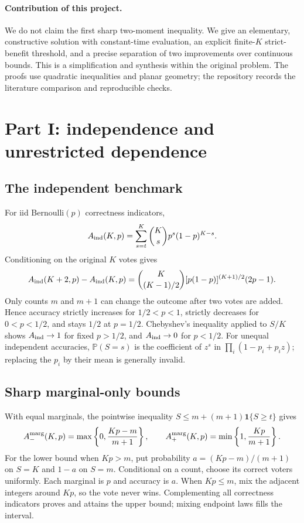 \documentclass{article}
\newcommand{\Prb}{\mathbb P}
\newcommand{\ind}{\mathbf 1}
\begin{document}
\paragraph{Contribution of this project.}
We do not claim the first sharp two-moment inequality. We give an elementary, constructive solution with constant-time evaluation, an explicit finite-$K$ strict-benefit threshold, and a precise separation of two improvements over continuous bounds. This is a simplification and synthesis within the original problem. The proofs use quadratic inequalities and planar geometry; the repository records the literature comparison and reproducible checks.

\clearpage
\section{Part I: independence and unrestricted dependence}
\subsection{The independent benchmark}
For iid Bernoulli$(p)$ correctness indicators,
\begin{equation}\label{eq:binomial}
 A_{\rm ind}(K,p)=\sum_{s=t}^K\binom Ks p^s(1-p)^{K-s}.
\end{equation}
Conditioning on the original $K$ votes gives
\begin{equation}\label{eq:increment}
 A_{\rm ind}(K+2,p)-A_{\rm ind}(K,p)
 =\binom K{(K-1)/2}[p(1-p)]^{(K+1)/2}(2p-1).
\end{equation}
Only counts $m$ and $m+1$ can change the outcome after two votes are added. Hence accuracy strictly increases for $1/2<p<1$, strictly decreases for $0<p<1/2$, and stays $1/2$ at $p=1/2$. Chebyshev's inequality applied to $S/K$ shows $A_{\rm ind}\to1$ for fixed $p>1/2$, and $A_{\rm ind}\to0$ for $p<1/2$. For unequal independent accuracies, $\Prb(S=s)$ is the coefficient of $z^s$ in $\prod_i(1-p_i+p_i z)$; replacing the $p_i$ by their mean is generally invalid.

\subsection{Sharp marginal-only bounds}
With equal marginals, the pointwise inequality $S\le m+(m+1)\ind\{S\ge t\}$ gives
\begin{equation}\label{eq:equal}
 A_-^{\rm marg}(K,p)=\max\left\{0,\frac{Kp-m}{m+1}\right\},\qquad
 A_+^{\rm marg}(K,p)=\min\left\{1,\frac{Kp}{m+1}\right\}.
\end{equation}
For the lower bound when $Kp>m$, put probability $a=(Kp-m)/(m+1)$ on $S=K$ and $1-a$ on $S=m$. Conditional on a count, choose its correct voters uniformly. Each marginal is $p$ and accuracy is $a$. When $Kp\le m$, mix the adjacent integers around $Kp$, so the vote never wins. Complementing all correctness indicators proves and attains the upper bound; mixing endpoint laws fills the interval.
\end{document}
